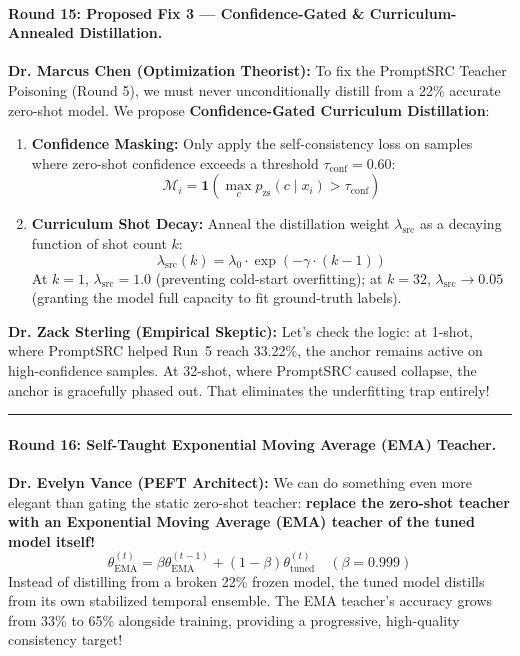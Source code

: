 \documentclass[letterpaper,11pt,leqno]{article}
\newcommand{\speakerVance}[1]{\noindent\textbf{\color{purple!80!black}Dr. Evelyn Vance (PEFT Architect):} #1\vspace{0.4em}}
\newcommand{\speakerChen}[1]{\noindent\textbf{\color{green!60!black}Dr. Marcus Chen (Optimization Theorist):} #1\vspace{0.4em}}
\newcommand{\speakerSterling}[1]{\noindent\textbf{\color{red!75!black}Dr. Zack Sterling (Empirical Skeptic):} #1\vspace{0.4em}}
\begin{document}
\paragraph{Round 15: Proposed Fix 3 — Confidence-Gated \& Curriculum-Annealed Distillation.}
\speakerChen{To fix the PromptSRC Teacher Poisoning (Round 5), we must never unconditionally distill from a 22\% accurate zero-shot model. We propose \textbf{Confidence-Gated Curriculum Distillation}:
\begin{enumerate}
    \item \textbf{Confidence Masking:} Only apply the self-consistency loss on samples where zero-shot confidence exceeds a threshold $\tau_\mathrm{conf} = 0.60$:
    \begin{equation}
        \mathcal{M}_i = \mathbf{1}\left( \max_c p_\mathrm{zs}(c \mid x_i) > \tau_\mathrm{conf} \right)
    \end{equation}
    \item \textbf{Curriculum Shot Decay:} Anneal the distillation weight $\lambda_\mathrm{src}$ as a decaying function of shot count $k$:
    \begin{equation}
        \lambda_\mathrm{src}(k) = \lambda_0 \cdot \exp(-\gamma \cdot (k - 1))
    \end{equation}
    At $k=1$, $\lambda_\mathrm{src} = 1.0$ (preventing cold-start overfitting); at $k=32$, $\lambda_\mathrm{src} \to 0.05$ (granting the model full capacity to fit ground-truth labels).
\end{enumerate}}

\speakerSterling{Let's check the logic: at 1-shot, where PromptSRC helped Run~5 reach 33.22\%, the anchor remains active on high-confidence samples. At 32-shot, where PromptSRC caused collapse, the anchor is gracefully phased out. That eliminates the underfitting trap entirely!}

\vspace{0.8em}\hrule\vspace{0.8em}

\paragraph{Round 16: Self-Taught Exponential Moving Average (EMA) Teacher.}
\speakerVance{We can do something even more elegant than gating the static zero-shot teacher: \textbf{replace the zero-shot teacher with an Exponential Moving Average (EMA) teacher of the tuned model itself!}
\begin{equation}
    \theta_\mathrm{EMA}^{(t)} = \beta \theta_\mathrm{EMA}^{(t-1)} + (1 - \beta) \theta_\mathrm{tuned}^{(t)} \quad (\beta = 0.999)
\end{equation}
Instead of distilling from a broken 22\% frozen model, the tuned model distills from its own stabilized temporal ensemble. The EMA teacher's accuracy grows from 33\% to 65\% alongside training, providing a progressive, high-quality consistency target!}
\end{document}
